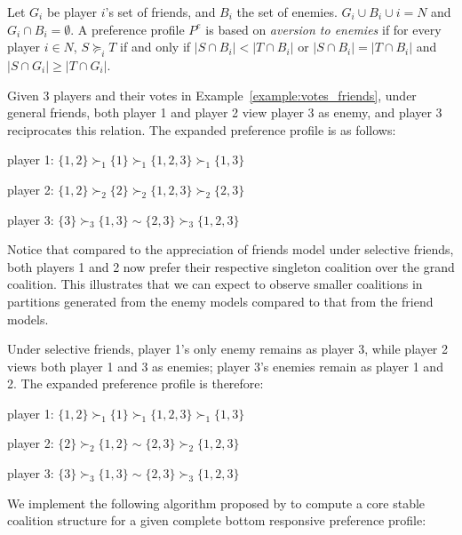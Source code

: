 Let $G_i$ be player $i$'s set of friends, and $B_i$ the set of enemies.
$G_i \cup B_i \cup i = N$ and $G_i \cap B_i = \emptyset$.
A preference profile $P^e$ is based on \textit{aversion to enemies} if for every
player $i \in N$, $S \succeq_i T$ if and only if $|S \cap B_i| < |T \cap B_i|$
or $|S \cap B_i| = |T \cap B_i|$ and $|S \cap G_i| \geq |T \cap G_i|$.

Given 3 players and their votes in Example~\ref{example:votes_friends},
under general friends, both player 1 and player 2 view player 3 as enemy, and
player 3 reciprocates this relation.
The expanded preference profile is as follows:

player 1: $\{1, 2\} \succ_1 \{1\} \succ_1 \{1, 2, 3\} \succ_1 \{1, 3\} $

player 2: $\{1, 2\} \succ_2 \{2\} \succ_2 \{1, 2, 3\} \succ_2 \{2, 3\}$

player 3: $\{3\} \succ_3 \{1, 3\} \sim \{2, 3\} \succ_3 \{1, 2, 3\}$

Notice that compared to the appreciation of friends model under selective
friends, both players 1 and 2 now prefer their respective singleton coalition
over the grand coalition.
This illustrates that we can expect to observe smaller coalitions in partitions
generated from the enemy models compared to that from the friend models.

Under selective friends, player 1's only enemy remains as player 3, while
player 2 views both player 1 and 3 as enemies; player 3's enemies remain as
player 1 and 2.
The expanded preference profile is therefore:

player 1: $\{1, 2\} \succ_1 \{1\} \succ_1 \{1, 2, 3\} \succ_1 \{1, 3\} $

player 2: $\{2\} \succ_2 \{1, 2\} \sim \{2, 3\} \succ_2 \{1, 2, 3\} $

player 3: $\{3\} \succ_3 \{1, 3\} \sim \{2, 3\} \succ_3 \{1, 2, 3\}$

We implement the following algorithm proposed by  to
compute a core stable coalition structure for a given complete bottom
responsive preference profile:

